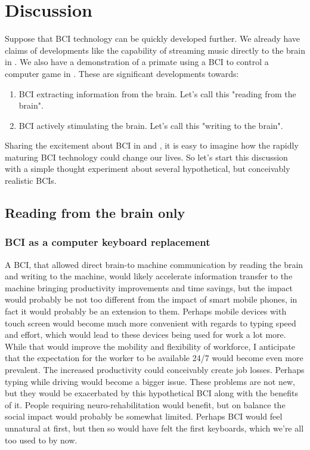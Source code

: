 \documentclass[fleqn,11pt]{olplainarticle}
\begin{document}
\section{Discussion}
Suppose that BCI technology can be quickly developed further. We already have claims of developments like the capability of streaming music directly to the brain in \cite{pero_2020}. We also have a demonstration of a primate using a BCI to control a computer game in \cite{wakefield_2020}. These are significant developments towards:
\begin{enumerate}
    \item BCI extracting information from the brain. Let's call this "reading from the brain".
    \item BCI actively stimulating the brain. Let's call this "writing to the brain".
\end{enumerate}

Sharing the excitement about BCI in \cite{warwick2003cyborg} and \cite{schalk2008brain}, it is easy to imagine how the rapidly maturing BCI technology could change our lives. So let's start this discussion with a simple thought experiment about several hypothetical, but conceivably realistic BCIs.

\subsection{Reading from the brain only}
\subsubsection{BCI as a computer keyboard replacement}
A BCI, that allowed direct brain-to machine communication by reading the brain and writing to the machine, would likely accelerate information transfer to the machine \cite{schalk2008brain} bringing productivity improvements and time savings, but the impact would probably be not too different from the impact of smart mobile phones, in fact it would probably be an extension to them. Perhaps mobile devices with touch screen would become much more convenient with regards to typing speed and effort, which would lead to these devices being used for work a lot more. While that would improve the mobility and flexibility of workforce, I anticipate that the expectation for the worker to be available 24/7 would become even more prevalent. The increased productivity could conceivably create job losses. Perhaps typing while driving would become a bigger issue. These problems are not new, but they would be exacerbated by this hypothetical BCI along with the benefits of it. People requiring neuro-rehabilitation would benefit, but on balance the social impact would probably be somewhat limited. Perhaps BCI would feel unnatural at first, but then so would have felt the first keyboards, which we're all too used to by now.
\end{document}

